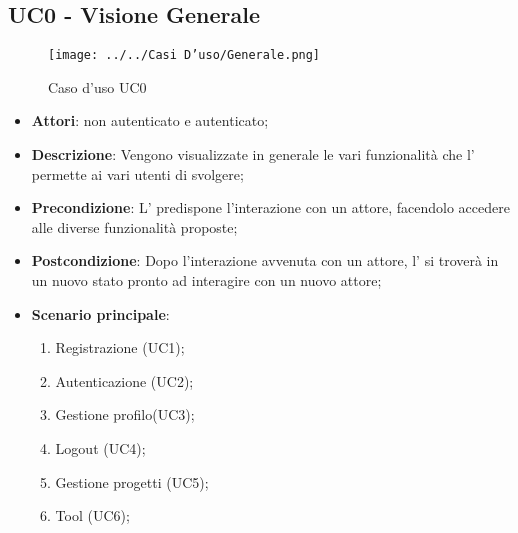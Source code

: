 \subsection{UC0 - Visione Generale}
\label{ssec:UC0}
\begin{figure}[h!]
\centering
\texttt{[image: ../../Casi D'uso/Generale.png]}
\caption{Caso d'uso UC0}
 \end{figure}
\begin{itemize}
\item \textbf{Attori}:  non autenticato e  autenticato;
\item \textbf{Descrizione}: Vengono visualizzate in generale le vari funzionalità che l' permette ai vari utenti di svolgere;
\item \textbf{Precondizione}: L' predispone l'interazione con un attore, facendolo accedere alle diverse funzionalità proposte;
\item \textbf{Postcondizione}: Dopo l'interazione avvenuta con un attore, l' si troverà in un nuovo stato pronto ad interagire con un nuovo attore;
\item \textbf{Scenario principale}: \begin{enumerate}\item Registrazione (UC1);\item Autenticazione (UC2);\item Gestione profilo(UC3);\item Logout (UC4);\item Gestione progetti (UC5);\item Tool  (UC6);
 \end{enumerate}
\end{itemize}

